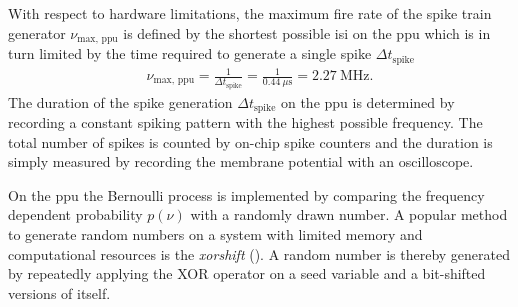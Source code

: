 With respect to hardware limitations, the maximum fire rate of the spike train generator $\nu_\text{max, ppu}$ is defined by the shortest possible \gls{isi} on the \gls{ppu} which is in turn limited by the time required to generate a single spike $\Delta t_\text{spike}$
\begin{align*}
\nu_\text{max, ppu} = \frac{1}{\Delta t_\text{spike}} = \frac{1}{\SI{0.44}{\mu \s}} = \SI{2.27}{\mega \Hz}.
\end{align*}
The duration of the spike generation $\Delta t_\text{spike}$ on the \gls{ppu} is determined by recording a constant spiking pattern with the highest possible frequency. The total number of spikes is counted by on-chip spike counters and the duration is simply measured by recording the membrane potential with an oscilloscope.


On the \gls{ppu} the Bernoulli process is implemented by comparing the frequency dependent probability $p(\nu)$ with a randomly drawn number. A popular method to generate random numbers on a system with limited memory and computational resources is the \emph{xorshift} (\citealp{marsaglia2003xorshift}). A random number is thereby generated by repeatedly applying the XOR operator on a seed variable and a bit-shifted versions of itself. %



